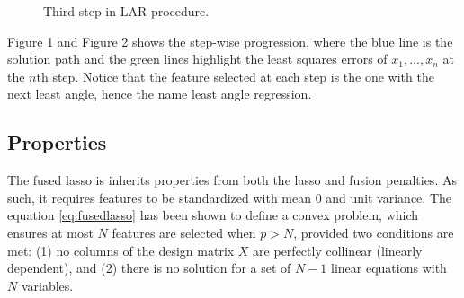 \documentclass[12pt]{article}
\begin{document}
\begin{figure}[htbp]
\begin{minipage}[t]{0.48\textwidth}
        \caption{Third step in LAR procedure.}
    \end{minipage}
\end{figure}

Figure 1 and Figure 2 shows the step-wise progression, where the blue line is the solution path and the green lines highlight the least squares errors of $x_1, \dots, x_n$ at the $n$th step. Notice that the feature selected at each step is the one with the next least angle, hence the name least angle regression.

\subsection{Properties}

The fused lasso is inherits properties from both the lasso and fusion penalties. As such, it requires features to be standardized with mean 0 and unit variance. The equation \ref{eq:fusedlasso} has been shown to define a convex problem, which ensures at most $N$ features 
 are selected when $p > N$, provided two conditions are met: (1) no columns of the design matrix $X$ are perfectly collinear (linearly dependent), and (2) there is no solution for a set of $N - 1$ linear equations with $N$ variables. 
\end{document}
